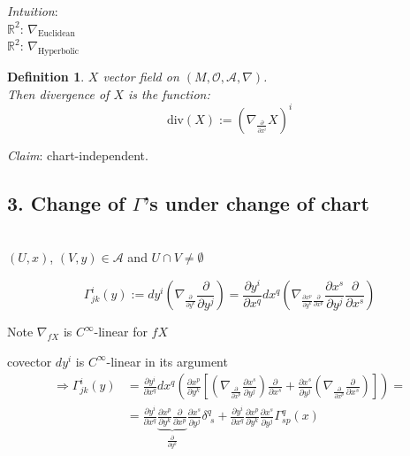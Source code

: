 \documentclass[10pt]{amsart}
\newtheorem{definition}{Definition}
\begin{document}
\begin{multicols*}{2}
\emph{Intuition}: \\

$\mathbb{R}^2$: $\nabla_{\text{Euclidean}}$ \\

$\mathbb{R}^2$: $\nabla_{\text{Hyperbolic}}$ 
 
\begin{definition}
	$X$ vector field on $(M, \mathcal{O}, \mathcal{A}, \nabla)$. \\
	Then divergence of $X$ is the function: 
	\[
	\text{div}(X):= \left( \nabla_{\frac{\partial}{\partial x^i}} X \right)^i
	\]
\end{definition}	

\emph{Claim}: chart-independent.
	
	\subsection*{3. Change of $\Gamma$'s under change of chart} \quad \\
	
	$(U,x)$, $(V,y) \in \mathcal{A}$ and $U \cap V \neq \emptyset$
	
	\[
	\Gamma^i_{jk}(y) := dy^i \left( \nabla_{ \frac{ \partial}{ \partial y^k} } \frac{ \partial }{ \partial y^j} \right) = \frac{ \partial y^i}{ \partial x^q }dx^q \left( \nabla_{\frac{ \partial x^p}{ \partial y^k}  \frac{ \partial }{ \partial x^p} } \frac{ \partial x^s}{ \partial y^j} \frac{ \partial }{ \partial x^s } \right)
	\]
	
	Note $\nabla_{fX}$ is $C^{\infty}$-linear for $fX$
	
	covector $dy^i$ is $C^{\infty}$-linear in its argument
	\[
	\begin{aligned}
	\Longrightarrow \Gamma_{jk}^i(y) & = \frac{ \partial y^i}{ \partial x^q} dx^q \left( \frac{ \partial x^p}{ \partial y^k} \left[ \left( \nabla_{ \frac{ \partial }{ \partial x^p} } \frac{ \partial x^s}{ \partial y^j} \right) \frac{ \partial }{ \partial x^s} + \frac{ \partial x^s}{ \partial y^j} \left( \nabla_{ \frac{ \partial }{ \partial x^p } } \frac{ \partial }{ \partial x^s } \right)  \right] \right) = \\
	& = \frac{ \partial y^i}{ \partial x^q} \underbrace{\frac{ \partial x^p }{ \partial y^k} \frac{ \partial }{ \partial x^p }}_{\frac{\partial}{\partial y^k} } \frac{ \partial x^s}{ \partial y^j } \delta^q_{ \, \, s} + \frac{ \partial y^i}{ \partial x^q} \frac{ \partial x^p }{ \partial y^k} \frac{ \partial x^s}{ \partial y^j} \Gamma^q_{sp}(x)
	\end{aligned}
	\]
	

\end{multicols*}
\end{document}
